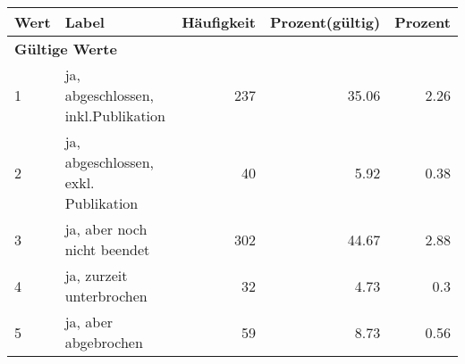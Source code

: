      \begin{longtable}{lXrrr}
     \toprule
     \textbf{Wert} & \textbf{Label} & \textbf{Häufigkeit} & \textbf{Prozent(gültig)} & \textbf{Prozent} \\
     \endhead
     \midrule
     \multicolumn{5}{l}{\textbf{Gültige Werte}}\\

     1 &
     \multicolumn{1}{X}{ ja, abgeschlossen, inkl.Publikation   } &


       \num{237} &
       \num[round-mode=places,round-precision=2]{35,06} &
         \num[round-mode=places,round-precision=2]{2,26} \\

     2 &
     \multicolumn{1}{X}{ ja, abgeschlossen, exkl. Publikation   } &


       \num{40} &
       \num[round-mode=places,round-precision=2]{5,92} &
         \num[round-mode=places,round-precision=2]{0,38} \\

     3 &
     \multicolumn{1}{X}{ ja, aber noch nicht beendet   } &


       \num{302} &
       \num[round-mode=places,round-precision=2]{44,67} &
         \num[round-mode=places,round-precision=2]{2,88} \\

     4 &
     \multicolumn{1}{X}{ ja, zurzeit unterbrochen   } &


       \num{32} &
       \num[round-mode=places,round-precision=2]{4,73} &
         \num[round-mode=places,round-precision=2]{0,3} \\

     5 &
     \multicolumn{1}{X}{ ja, aber abgebrochen   } &


       \num{59} &
       \num[round-mode=places,round-precision=2]{8,73} &
         \num[round-mode=places,round-precision=2]{0,56} \\


\end{longtable}

